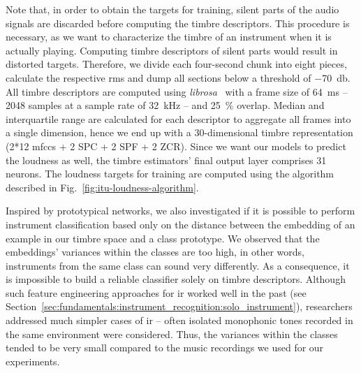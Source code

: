 Note that, in order to obtain the targets for training, silent parts of the audio signals are discarded before computing the timbre descriptors. This procedure is necessary, as we want to characterize the timbre of an instrument when it is actually playing. Computing timbre descriptors of silent parts would result in distorted targets. Therefore, we divide each four-second chunk into eight pieces, calculate the respective \gls{rms} and dump all sections below a threshold of \SI{-70}{\decibel}. All timbre descriptors are computed using \textit{librosa}~\cite{mcfee2015librosa} with a frame size of \SI{64}{\milli\second} -- 2048 samples at a sample rate of \SI{32}{\kilo\hertz} -- and \SI{25}{\percent} overlap. Median and interquartile range are calculated for each descriptor to aggregate all frames into a single dimension, hence we end up with a 30-dimensional timbre representation (2*12 \glspl{mfcc} + 2 SPC + 2 SPF + 2 ZCR). Since we want our models to predict the loudness as well, the timbre estimators' final output layer comprises 31 neurons. The loudness targets for training are computed using the algorithm described in Fig.~\ref{fig:itu-loudness-algorithm}.\\

Inspired by prototypical networks, we also investigated if it is possible to perform instrument classification based only on the distance between the embedding of an example in our timbre space and a class prototype. We observed that the embeddings' variances within the classes are too high, in other words, instruments from the same class can sound very differently. As a consequence, it is impossible to build a reliable classifier solely on timbre descriptors. Although such feature engineering approaches for \gls{ir} worked well in the past (see Section~\ref{sec:fundamentals:instrument_recognition:solo_instrument}), researchers addressed much simpler cases of \gls{ir} -- often isolated monophonic tones recorded in the same environment were considered. Thus, the variances within the classes tended to be very small compared to the music recordings we used for our experiments.

